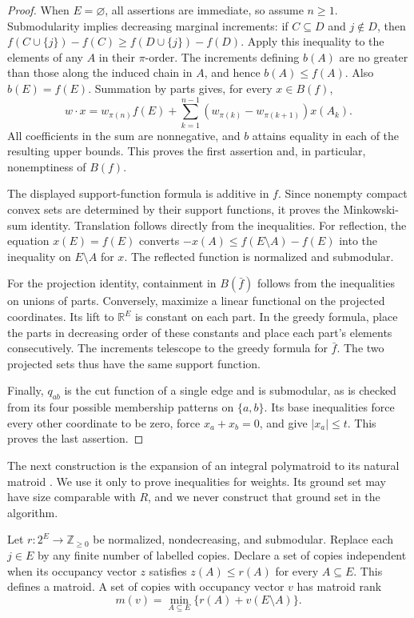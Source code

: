 \begin{proof}
When $E=\varnothing$, all assertions are immediate, so assume $n\geq1$.
Submodularity implies decreasing marginal increments: if $C\subseteq D$
and $j\notin D$, then
$f(C\cup\{j\})-f(C)\geq f(D\cup\{j\})-f(D)$.
Apply this inequality to the elements of any $A$ in their $\pi$-order.
The increments defining $b(A)$ are no greater than those along the
induced chain in $A$, and hence $b(A)\leq f(A)$.  Also $b(E)=f(E)$.
Summation by parts gives, for every $x\in B(f)$,
\[
 w\cdot x=w_{\pi(n)}f(E)
  +\sum_{k=1}^{n-1}(w_{\pi(k)}-w_{\pi(k+1)})x(A_k).
\]
All coefficients in the sum are nonnegative, and $b$ attains equality
in each of the resulting upper bounds.  This proves the first assertion
and, in particular, nonemptiness of $B(f)$.

The displayed support-function formula is additive in $f$.  Since
nonempty compact convex sets are determined by their support functions,
it proves the Minkowski-sum identity.  Translation follows directly from
the inequalities.  For reflection, the equation $x(E)=f(E)$ converts
$-x(A)\leq f(E\setminus A)-f(E)$ into the inequality on
$E\setminus A$ for $x$.  The reflected function is normalized and
submodular.

For the projection identity, containment in $B(\bar f)$ follows from
the inequalities on unions of parts.  Conversely, maximize a linear
functional on the projected coordinates.  Its lift to $\mathbb R^E$
is constant on each part.  In the greedy formula, place the parts in
decreasing order of these constants and place each part's elements
consecutively.  The increments telescope to the greedy formula for
$\bar f$.  The two projected sets thus have the same support function.

Finally, $q_{ab}$ is the cut function of a single edge and is
submodular, as is checked from its four possible membership patterns
on $\{a,b\}$.  Its base inequalities force every other coordinate to
be zero, force $x_a+x_b=0$, and give $|x_a|\leq t$.  This proves the
last assertion.
\end{proof}

The next construction is the expansion of an integral polymatroid to
its natural matroid \cite{Helgason1974}.  We use it only to prove
inequalities for weights.  Its ground set may have size comparable with
$R$, and we never construct that ground set in the algorithm.

\begin{lemma}\label{lem:expansion-matroid}
Let $r:2^E\to\mathbb Z_{\geq0}$ be normalized, nondecreasing, and
submodular.  Replace each $j\in E$ by any finite number of labelled
copies.  Declare a set of copies independent when its occupancy vector
$z$ satisfies $z(A)\leq r(A)$ for every $A\subseteq E$.
This defines a matroid.  A set of copies with occupancy vector $v$ has
matroid rank
\begin{equation}\label{eq:expansion-rank}
 m(v)=\min_{A\subseteq E}\{r(A)+v(E\setminus A)\}.
\end{equation}
\end{lemma}

